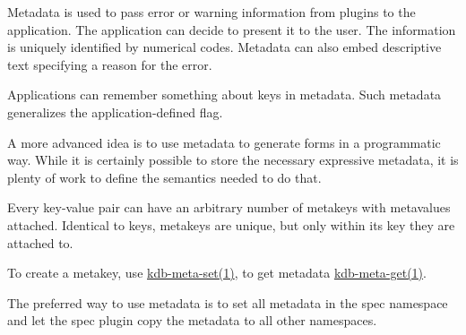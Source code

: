 \begin{DoxyItemize}
\item Metadata is used to pass error or warning information from plugins to the application. The application can decide to present it to the user. The information is uniquely identified by numerical codes. Metadata can also embed descriptive text specifying a reason for the error.
\item Applications can remember something about keys in metadata. Such metadata generalizes the application-\/defined flag.
\item A more advanced idea is to use metadata to generate forms in a programmatic way. While it is certainly possible to store the necessary expressive metadata, it is plenty of work to define the semantics needed to do that.
\end{DoxyItemize}

Every key-\/value pair can have an arbitrary number of metakeys with metavalues attached. Identical to keys, metakeys are unique, but only within its key they are attached to.

To create a metakey, use \hyperlink{doc_help_kdb-meta-set_md}{kdb-\/meta-\/set(1)}, to get metadata \hyperlink{doc_help_kdb-meta-get_md}{kdb-\/meta-\/get(1)}.

The preferred way to use metadata is to set all metadata in the {\ttfamily spec} namespace and let the {\ttfamily spec} plugin copy the metadata to all other namespaces. 